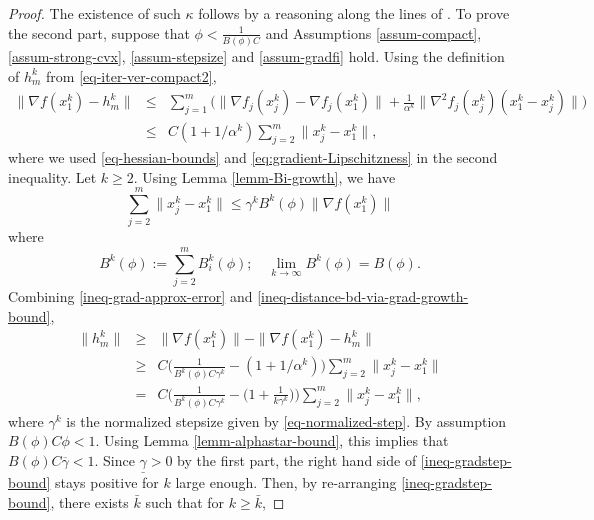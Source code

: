 \documentclass[final,numbook]{svjour3}
\begin{document}
\begin{proof}
The existence of such $\kappa$ follows by a reasoning along the lines of \cite[Theorem 4.2]{AlgEkfs2003}. To prove the second part, suppose that $\phi < \frac{1}{B(\phi)C}$ and Assumptions \ref{assum-compact}, \ref{assum-strong-cvx}, \ref{assum-stepsize} and \ref{assum-gradfi} hold.  
Using the definition of $h_m^k$ from \eqref{eq-iter-ver-compact2},
\begin{eqnarray}
   \| \nabla f(x_1^k) - h_m^k \| &\leq& \sum_{j=1}^m \bigg( \| \nabla f_j(x_j^k) - \nabla f_j(x_1^k) \| + \frac{1}{\alpha^k} \| \nabla^2 f_j(x_j^k)(x_1^k - x_j^k) \| \bigg) \nonumber \\
   &\leq& C( 1 + 1/\alpha^k) \sum_{j=2}^m  \|x_j^k - x_1^k\|, \label{ineq-grad-approx-error} 
  
  
\end{eqnarray}
where we used \eqref{eq-hessian-bounds} and \eqref{eq:gradient-Lipschitzness} in the second inequality. Let $k\geq 2$. Using Lemma \ref{lemm-Bi-growth}, we have 
\begin{equation}\label{ineq-distance-bd-via-grad-growth-bound}
	\sum_{j=2}^m  \|x_j^k - x_1^k\| \leq \gamma^k B^k(\phi)  \| \nabla f(x_1^k)\| 
\end{equation}
where \begin{equation}\label{def-Bk-phi}
B^k(\phi):=\sum_{j=2}^m B_i^k(\phi); \quad \lim_{k \to \infty} B^k(\phi)=B(\phi).
\end{equation} 
Combining \eqref{ineq-grad-approx-error} and \eqref{ineq-distance-bd-via-grad-growth-bound}, 
\begin{eqnarray}
	\| h_m^k \| &\geq& \| \nabla f(x_1^k) \| - \| \nabla f(x_1^k) - h_m^k \|  \nonumber \\
	 &\geq& C \bigg( \frac{1}{ B^k(\phi) C\gamma^k} - (1+1/\alpha^k)\bigg)  \sum_{j=2}^m  \|x_j^k - x_1^k\| \nonumber \\
	 &=& C \bigg( \frac{1}{ B^k(\phi) C \gamma^k} - \big(1+\frac{1}{k\gamma^k}\big)\bigg)  \sum_{j=2}^m  \|x_j^k - x_1^k\|, \label{ineq-gradstep-bound} 
\end{eqnarray}
where $\gamma^k$ is the normalized stepsize given by \eqref{eq-normalized-step}. By assumption $ B(\phi) C \phi < 1$. Using Lemma \ref{lemm-alphastar-bound}, this implies that $ B(\phi)C {{\overline{\gamma}}} <1$. Since ${{\underline{\gamma}}} > 0$ by the first part, the right hand side of \eqref{ineq-gradstep-bound} stays positive for $k$ large enough. Then, by re-arranging \eqref{ineq-gradstep-bound}, there exists $\bar{k}$ such that for $k\geq \bar{k}$,

\end{proof}
\end{document}
